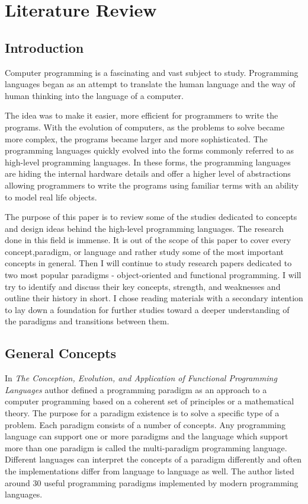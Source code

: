 \documentclass[12pt,twoside,a4paper]{report}
\begin{document}
\chapter{Literature Review}\label{2}

\section{Introduction}\label{2.1}
Computer programming is a fascinating and vast subject to study. Programming languages began as an attempt to translate the human language and the way of human thinking into the language of a computer.\par
The idea was to make it easier, more efficient for programmers to write the programs. With the evolution of computers, as the problems to solve became more complex, the programs became larger and more sophisticated. The programming languages quickly evolved into the forms commonly referred to as high-level programming languages. In these forms, the programming languages are hiding the internal hardware details and offer a higher level of abstractions allowing programmers to write the programs using familiar terms with an ability to model real life objects.\par
The purpose of this paper is to review some of the studies dedicated to concepts and design ideas behind the high-level programming languages. The research done in this field is immense. It is out of the scope of this paper to cover every concept,paradigm, or language and rather study some of the most important concepts in general. Then I will continue to study research papers dedicated to two most popular paradigms - object-oriented and functional programming. I will try to identify and discuss their key concepts, strength, and weaknesses and outline their history in short. I chose reading materials with a secondary intention to lay down a foundation for further studies toward a deeper understanding of the paradigms and transitions between them.

\section{General Concepts}\label{2.2}
In \emph{The Conception, Evolution, and Application of Functional Programming Languages}\cite{12} author defined a programming paradigm as an approach to a computer programming based on a coherent set of principles or a mathematical theory. The purpose for a paradigm existence is to solve a specific type of a problem. Each paradigm consists of a number of concepts. Any programming language can support one or more paradigms and the language which support more than one paradigm is called the multi-paradigm programming language. Different languages can interpret the concepts of a paradigm differently and often the implementations differ from language to language as well. The author listed around 30 useful programming paradigms implemented by modern programming languages.
\end{document}
